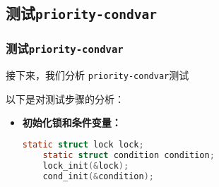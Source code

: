 \documentclass{beamer}
\begin{document}
\subsection{测试\texttt{priority-condvar}}
\begin{frame}
  \frametitle{测试\texttt{priority-condvar}}
  接下来，我们分析 \texttt{priority-condvar}测试

    
      
    
    
    
    


  \framebreak

  以下是对测试步骤的分析：

  \begin{itemize}
    \item \textbf{初始化锁和条件变量：}
          \begin{lstlisting}[language=C]
    static struct lock lock;
    static struct condition condition;
    lock_init(&lock);
    cond_init(&condition);
\end{lstlisting}


\end{itemize}
\end{frame}
\end{document}
